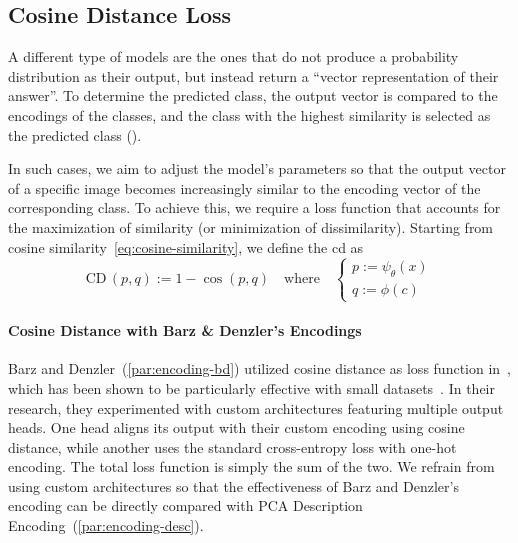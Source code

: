 \subsection{Cosine Distance Loss}
\label{subsec:cosine-distance-loss}

A different type of models are the ones that do not produce a probability distribution as their output, but instead return a ``vector representation of their answer''. To determine the predicted class, the output vector is compared to the encodings of the classes, and the class with the highest similarity is selected as the predicted class ().

In such cases, we aim to adjust the model's parameters so that the output vector of a specific image becomes increasingly similar to the encoding vector of the corresponding class. To achieve this, we require a loss function that accounts for the maximization of similarity (or minimization of dissimilarity).
Starting from cosine similarity~\eqref{eq:cosine-similarity}, we define the \acrfull{cd} as
\begin{equation}
  \textrm{CD} \, (p, q) := 1 - \cos (p, q)
  \label{eq:cosine-distance}
  \quad \textrm{where} \quad
  \begin{cases}
    p := \psi_\theta(x) \\
    q := \phi(c)
  \end{cases}
\end{equation}

\paragraph{Cosine Distance with Barz \& Denzler's Encodings} Barz and Denzler~(\ref{par:encoding-bd}) utilized cosine distance as loss function in~\cite{HierarchyBasedBarz2018}, which has been shown to be particularly effective with small datasets~\cite{DeepLearningOBarz2019}. In their research, they experimented with custom architectures featuring multiple output heads. One head aligns its output with their custom encoding using cosine distance, while another uses the standard cross-entropy loss with one-hot encoding. The total loss function is simply the sum of the two.
We refrain from using custom architectures so that the effectiveness of Barz and Denzler's encoding can be directly compared with PCA Description Encoding~(\ref{par:encoding-desc}).

